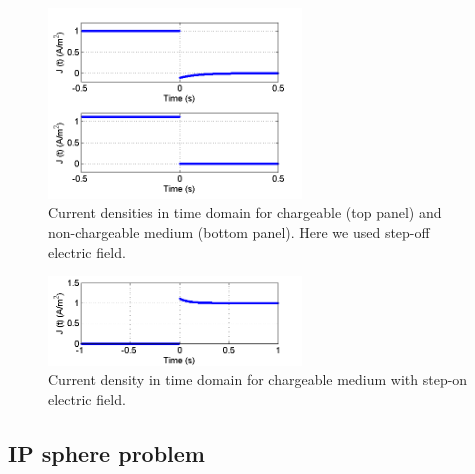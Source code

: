 \documentclass[a4paper, 11pt]{article}
\begin{document}
\begin{figure}[htb]
	\centering
	\includegraphics[width=0.6\textwidth]{PostJ.png}
	\caption{Current densities in time domain for chargeable (top panel) and non-chargeable medium (bottom panel). Here we used step-off electric field.}
	\label{F:Postj}
\end{figure}
\begin{figure}[htb]
	\centering
	\includegraphics[width=0.6\textwidth]{PostJstepon.png}
	\caption{Current density in time domain for chargeable medium with step-on electric field.}
	\label{F:Postjstepon}
\end{figure}
\clearpage

\subsection{IP sphere problem}
\end{document}
